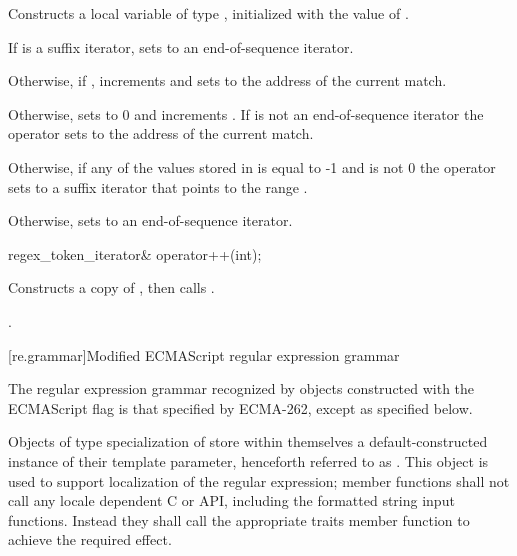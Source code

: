 \begin{itemdescr}
\pnum
\effects
Constructs a local variable  of
type , initialized with the value
of .

\pnum
If  is a suffix iterator, sets  to an
end-of-sequence iterator.

\pnum
Otherwise, if , increments  and
sets  to the address of the current match.

\pnum
Otherwise, sets  to 0 and
increments . If  is not an
end-of-sequence iterator the operator sets  to the
address of the current match.

\pnum
Otherwise, if any of the values stored in  is equal to -1 and
 is not 0 the operator sets  to a
suffix iterator that points to the range .

\pnum
Otherwise, sets  to an end-of-sequence iterator.

\pnum
\returns
{}
\end{itemdescr}

%
\begin{itemdecl}
regex_token_iterator& operator++(int);
\end{itemdecl}

\begin{itemdescr}
\pnum
\effects
Constructs a copy  of , then calls .

\pnum
\returns
{}.
\end{itemdescr}

[re.grammar]{Modified ECMAScript regular expression grammar}
%
%

\pnum
{}%
%
The regular expression grammar recognized by
 objects constructed with the ECMAScript
flag is that specified by ECMA-262, except as specified below.

\pnum
{}%
%
Objects of type specialization of  store within themselves a
default-constructed instance of their  template parameter, henceforth
referred to as . This  object is used to support localization
of the regular expression;  member functions shall not call
any locale dependent C or \Cpp{} API, including the formatted string input functions.
Instead they shall call the appropriate traits member function to achieve the required effect.

